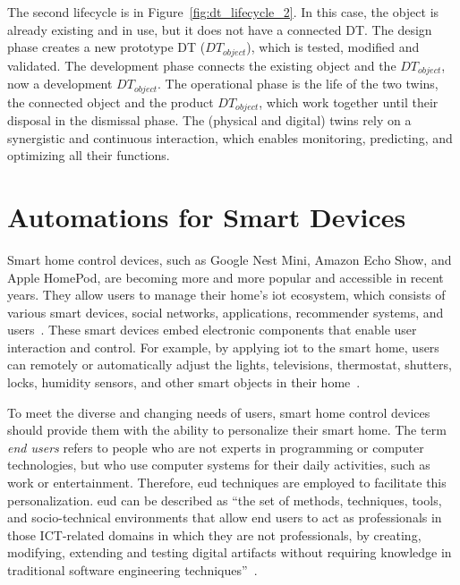 The second lifecycle is in Figure~\ref{fig:dt_lifecycle_2}. In this case, the object is already existing and in use, but it does not have a connected DT. The design phase creates a new prototype DT ($DT_{object}$), which is tested, modified and validated. The development phase connects the existing object and the $DT_{object}$, now a development $DT_{object}$. The operational phase is the life of the two twins, the connected object and the product $DT_{object}$, which work together until their disposal in the dismissal phase. The (physical and digital) twins rely on a synergistic and continuous interaction, which enables monitoring, predicting, and optimizing all their functions.

\section{Automations for Smart Devices}

Smart home control devices, such as Google Nest Mini, Amazon Echo Show, and Apple HomePod, are becoming more and more popular and accessible in recent years. They allow users to manage their home's \acrfull{iot} ecosystem, which consists of various smart devices, social networks, applications, recommender systems, and users~\parencite{barricelliDesigningEndUserDevelopment2015}. These smart devices embed electronic components that enable user interaction and control. For example, by applying \acrshort{iot} to the smart home, users can remotely or automatically adjust the lights, televisions, thermostat, shutters, locks, humidity sensors, and other smart objects in their home~\parencite{kortuemSmartObjectsBuilding2010,wuRespectChangeUser2017}.

To meet the diverse and changing needs of users, smart home control devices should provide them with the ability to personalize their smart home. The term \textit{end users} refers to people who are not experts in programming or computer technologies, but who use computer systems for their daily activities, such as work or entertainment. Therefore, \acrfull{eud} techniques are employed to facilitate this personalization. \acrshort{eud} can be described as “the set of methods, techniques, tools, and socio-technical environments that allow end users to act as professionals in those ICT-related domains in which they are not professionals, by creating, modifying, extending and testing digital artifacts without requiring knowledge in traditional software engineering techniques”~\parencite{barricelliEnduserDevelopmentEnduser2019}.

